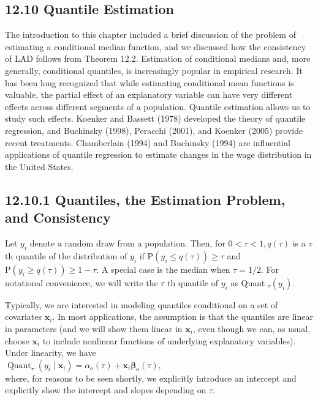 \documentclass[10pt]{article}
\begin{document}
\subsection*{12.10 Quantile Estimation}
The introduction to this chapter included a brief discussion of the problem of estimating a conditional median function, and we discussed how the consistency of LAD follows from Theorem 12.2. Estimation of conditional medians and, more generally, conditional quantiles, is increasingly popular in empirical research. It has been long recognized that while estimating conditional mean functions is valuable, the partial effect of an explanatory variable can have very different effects across different segments of a population. Quantile estimation allows us to study such effects. Koenker and Bassett (1978) developed the theory of quantile regression, and Buchinsky (1998), Peracchi (2001), and Koenker (2005) provide recent treatments. Chamberlain (1994) and Buchinsky (1994) are influential applications of quantile regression to estimate changes in the wage distribution in the United States.

\subsection*{12.10.1 Quantiles, the Estimation Problem, and Consistency}
Let $y_{i}$ denote a random draw from a population. Then, for $0<\tau<1, q(\tau)$ is a $\tau$ th quantile of the distribution of $y_{i}$ if $\mathrm{P}\left(y_{i} \leq q(\tau)\right) \geq \tau$ and $\mathrm{P}\left(y_{i} \geq q(\tau)\right) \geq 1-\tau$. A special case is the median when $\tau=1 / 2$. For notational convenience, we will write the $\tau$ th quantile of $y_{i}$ as Quant $_{\tau}\left(y_{i}\right)$.

Typically, we are interested in modeling quantiles conditional on a set of covariates $\mathbf{x}_{i}$. In most applications, the assumption is that the quantiles are linear in parameters (and we will show them linear in $\mathbf{x}_{i}$, even though we can, as usual, choose $\mathbf{x}_{i}$ to include nonlinear functions of underlying explanatory variables). Under linearity, we have\\
$\operatorname{Quant}_{\tau}\left(y_{i} \mid \mathbf{x}_{i}\right)=\alpha_{\mathrm{o}}(\tau)+\mathbf{x}_{i} \boldsymbol{\beta}_{\mathrm{o}}(\tau)$,\\
where, for reasons to be seen shortly, we explicitly introduce an intercept and explicitly show the intercept and slopes depending on $\tau$.
\end{document}
